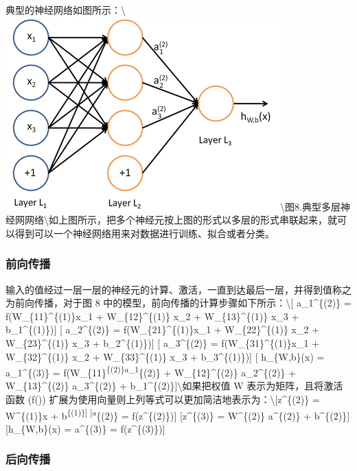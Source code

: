 典型的神经网络如图所示：\textbackslash{}\includegraphics{picture/MLP.png}\textbackslash{}图8.典型多层神经网网络\textbackslash{}如上图所示，把多个神经元按上图的形式以多层的形式串联起来，就可以得到可以一个神经网络用来对数据进行训练、拟合或者分类。

\subsubsection{前向传播}\label{ux524dux5411ux4f20ux64ad}

输入的值经过一层一层的神经元的计算、激活，一直到达最后一层，并得到值称之为前向传播，对于图
8 中的模型，前向传播的计算步骤如下所示：\textbackslash{}{[}
a\_1\^{}\{(2)\} = f(W\_\{11\}\^{}\{(1)\}x\_1 + W\_\{12\}\^{}\{(1)\} x\_2
+ W\_\{13\}\^{}\{(1)\} x\_3 + b\_1\^{}\{(1)\}){]} {[} a\_2\^{}\{(2)\} =
f(W\_\{21\}\^{}\{(1)\}x\_1 + W\_\{22\}\^{}\{(1)\} x\_2 +
W\_\{23\}\^{}\{(1)\} x\_3 + b\_2\^{}\{(1)\}){]} {[} a\_3\^{}\{(2)\} =
f(W\_\{31\}\^{}\{(1)\}x\_1 + W\_\{32\}\^{}\{(1)\} x\_2 +
W\_\{33\}\^{}\{(1)\} x\_3 + b\_3\^{}\{(1)\}){]} {[} h\_\{W,b\}(x) =
a\_1\^{}\{(3)\} = f(W\_\{11\}\textsuperscript{\{(2)\}a\_1}\{(2)\} +
W\_\{12\}\^{}\{(2)\} a\_2\^{}\{(2)\} + W\_\{13\}\^{}\{(2)\}
a\_3\^{}\{(2)\} + b\_1\^{}\{(2)\}{]}\textbackslash{}如果把权值 W
表示为矩阵，且将激活函数 (f())
扩展为使用向量则上列等式可以更加简洁地表示为：\textbackslash{}{[}z\^{}\{(2)\}
= W\^{}\{(1)\}x + b\textsuperscript{\{(1)\}{]} {[}a}\{(2)\} =
f(z\^{}\{(2)\}){]} {[}z\^{}\{(3)\} = W\^{}\{(2)\} a\^{}\{(2)\} +
b\^{}\{(2)\}{]} {[}h\_\{W,b\}(x) = a\^{}\{(3)\} = f(z\^{}\{(3)\}){]}

\subsubsection{后向传播}\label{ux540eux5411ux4f20ux64ad}

